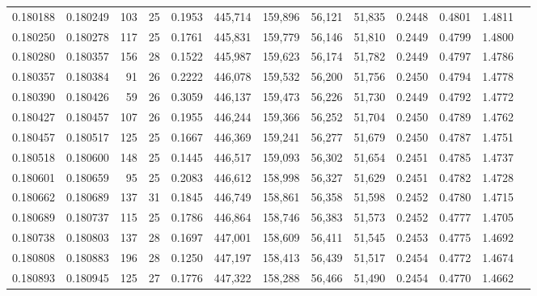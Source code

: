\begin{tabular}{rrrrrrrrrrrrr}
0.180188 & 0.180249 & 103 &  25 &                                     0.1953 & 445,714 & 159,896 &  56,121 &  51,835 & 0.2448 & 0.4801 & 1.4811 \\
0.180250 & 0.180278 & 117 &  25 &                                     0.1761 & 445,831 & 159,779 &  56,146 &  51,810 & 0.2449 & 0.4799 & 1.4800 \\
0.180280 & 0.180357 & 156 &  28 &                                     0.1522 & 445,987 & 159,623 &  56,174 &  51,782 & 0.2449 & 0.4797 & 1.4786 \\
0.180357 & 0.180384 &  91 &  26 &                                     0.2222 & 446,078 & 159,532 &  56,200 &  51,756 & 0.2450 & 0.4794 & 1.4778 \\
0.180390 & 0.180426 &  59 &  26 &                                     0.3059 & 446,137 & 159,473 &  56,226 &  51,730 & 0.2449 & 0.4792 & 1.4772 \\
0.180427 & 0.180457 & 107 &  26 &                                     0.1955 & 446,244 & 159,366 &  56,252 &  51,704 & 0.2450 & 0.4789 & 1.4762 \\
0.180457 & 0.180517 & 125 &  25 &                                     0.1667 & 446,369 & 159,241 &  56,277 &  51,679 & 0.2450 & 0.4787 & 1.4751 \\
0.180518 & 0.180600 & 148 &  25 &                                     0.1445 & 446,517 & 159,093 &  56,302 &  51,654 & 0.2451 & 0.4785 & 1.4737 \\
0.180601 & 0.180659 &  95 &  25 &                                     0.2083 & 446,612 & 158,998 &  56,327 &  51,629 & 0.2451 & 0.4782 & 1.4728 \\
0.180662 & 0.180689 & 137 &  31 &                                     0.1845 & 446,749 & 158,861 &  56,358 &  51,598 & 0.2452 & 0.4780 & 1.4715 \\
0.180689 & 0.180737 & 115 &  25 &                                     0.1786 & 446,864 & 158,746 &  56,383 &  51,573 & 0.2452 & 0.4777 & 1.4705 \\
0.180738 & 0.180803 & 137 &  28 &                                     0.1697 & 447,001 & 158,609 &  56,411 &  51,545 & 0.2453 & 0.4775 & 1.4692 \\
0.180808 & 0.180883 & 196 &  28 &                                     0.1250 & 447,197 & 158,413 &  56,439 &  51,517 & 0.2454 & 0.4772 & 1.4674 \\
0.180893 & 0.180945 & 125 &  27 &                                     0.1776 & 447,322 & 158,288 &  56,466 &  51,490 & 0.2454 & 0.4770 & 1.4662 \\

\end{tabular}
